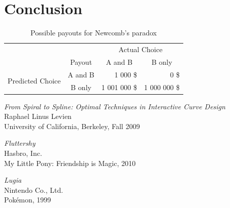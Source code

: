 \documentclass[a4paper]{article}
\begin{document}

	\section{Conclusion}


		\begin{table}[htbp]
			\centering
			\begin{tabular}{c|c|r|r|}
				\multicolumn{1}{c}{} & \multicolumn{1}{c}{} & \multicolumn{2}{c}{Actual Choice} \\
				\cline{2-4}
				& Payout & \multicolumn{1}{|c|}{A and B} & \multicolumn{1}{|c|}{B only} \\
				\cline{2-4}
				\multirow{2}{*}{Predicted Choice} & A and B & 1 000 \$ & 0 \$ \\
				\cline{2-4}
				& B only & 1 001 000 \$ & 1 000 000 \$ \\
				\cline{2-4}
			\end{tabular}
			\caption{Possible payouts for Newcomb's paradox}
			\label{table:NewcombParadoxPayouts}
		\end{table}

	\begin{thebibliography}{}

			\emph{From Spiral to Spline: Optimal Techniques in Interactive Curve Design}\\
			Raphael Linus Levien\\
			University of California, Berkeley, Fall 2009

			\emph{Fluttershy}\\
			Hasbro, Inc.\\
			My Little Pony: Friendship is Magic, 2010

			\emph{Lugia}\\
			Nintendo Co., Ltd.\\
			Pokémon, 1999

	\end{thebibliography}
\end{document}
